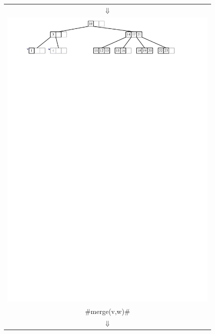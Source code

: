 \begin{figure}
{\begin{tabular}{@{}l@{}}
     \multicolumn{1}{c}{$\Downarrow$} \\[2ex]
     \includegraphics[width=\ScaleIfNeeded]{figs/btree-remove-full-2} \\[2ex]
     \multicolumn{1}{c}{#merge(v,w)#} \\
     \multicolumn{1}{c}{$\Downarrow$} \\[2ex]

\end{tabular}}
\end{figure}
